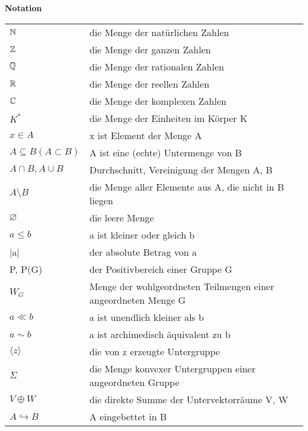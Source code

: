 \newpage
{\LARGE \textbf{Notation}}
\vspace{1.6cm}
\begin{center}
\begin{tabular}{ll}
  $\mathbb{N}$ & die Menge der natürlichen Zahlen \\
  $\mathbb{Z}$ & die Menge der ganzen Zahlen\\
  $\mathbb{Q}$ & die Menge der rationalen Zahlen\\
  $\mathbb{R}$ & die Menge der reellen Zahlen\\
  $\mathbb{C}$ & die Menge der komplexen Zahlen\\
  $K^*$& die Menge der Einheiten im Körper K\\
  $x \in A$ & x ist Element der Menge A\\
  $A\subseteq B (A \subset B)$& A ist eine (echte) Untermenge von B \\
  $A \cap B, A \cup B$ & Durchschnitt, Vereinigung der Mengen A, B\\
  $A \setminus B$ & die Menge aller Elemente aus A, die nicht in B liegen \\
  $\varnothing$ & die leere Menge \\
  $ a \leq b$ & a ist kleiner oder gleich b\\
  |a| & der absolute Betrag von a\\
  P, P(G) & der Positivbereich einer Gruppe G \\
  $W_G$ & Menge der wohlgeordneten Teilmengen einer angeordneten Menge G\\
  $a \ll b$ & a ist unendlich kleiner als b\\
  $a \sim b$ & a ist archimedisch äquivalent zu b\\
  $\langle z \rangle$ & die von z erzeugte Untergruppe\\
  $\Sigma$ & die Menge konvexer Untergruppen einer angeordneten Gruppe\\
  $V \oplus W$ & die direkte Summe der Untervektorräume V, W \\
  $A \hookrightarrow B$ & A eingebettet in B\\
 \end{tabular}
\end{center}